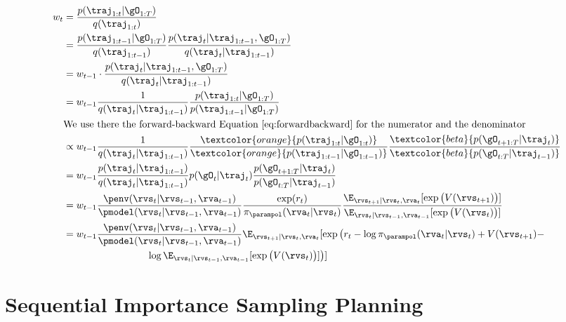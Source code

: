 \label{app:rec_weights}
\begin{align}
w_t &= \frac{p(\traj_{1:t} | \gO_{1:T})}{q(\traj_{1:t})} \nonumber\\
&= \frac{p(\traj_{1:t-1} | \gO_{1:T})}{q(\traj_{1:t-1})}\frac{p(\traj_t |\traj_{1:t-1}, \gO_{1:T})}{q(\traj_t | \traj_{1:t-1})} \nonumber\\
&= w_{t-1} \cdot \frac{p(\traj_t |\traj_{1:t-1}, \gO_{1:T})}{q(\traj_t | \traj_{1:t-1})} \nonumber\\
&= w_{t-1} \frac{1}{ q(\traj_t | \traj_{1:t-1})} \frac{p(\traj_{1:t} | \gO_{1:T})}{ p(\traj_{1:t-1} | \gO_{1:T})} \nonumber\\
&\text{We use there the forward-backward Equation~\ref{eq:forwardbackward} for the numerator and the denominator} \nonumber\\
 &\propto w_{t-1}   \frac{1}{ q(\traj_t | \traj_{1:t-1})} \frac{ \textcolor{orange}{p(\traj_{1:t} | \gO_{1:t})}}{ \textcolor{orange}{p(\traj_{1:t-1} | \gO_{1:t-1})}} \frac{ \textcolor{beta}{p(\gO_{t+1:T} | \traj_{t})}}{ \textcolor{beta}{p(\gO_{t:T} | \traj_{t-1})}}   \nonumber\\
&= w_{t-1}   \frac{ p(\traj_t | \traj_{1:t-1})}{ q(\traj_t | \traj_{1:t-1})}  p(\gO_t | \traj_t)   \frac{ p(\gO_{t+1:T} | \traj_{t})}{ p(\gO_{t:T} | \traj_{t-1})}  \nonumber\\
&= w_{t-1}    \frac{\penv(\rvs_{t} | \rvs_{t-1}, \rva_{t-1})}{ \pmodel(\rvs_{t} | \rvs_{t-1}, \rva_{t-1}) }   \frac{\exp (r_t)}{\pi_\parampol(\rva_t|\rvs_t)} \frac{\E_{\rvs_{t+1} | \rvs_t, \rva_t} [ \exp \big( V(\rvs_{t+1}) \big)] }{\E_{\rvs_{t} | \rvs_{t-1}, \rva_{t-1}} [ \exp \big( V(\rvs_{t}) \big)]}  \nonumber\\
&= w_{t-1} \frac{\penv(\rvs_{t} | \rvs_{t-1}, \rva_{t-1})}{ \pmodel(\rvs_{t} | \rvs_{t-1}, \rva_{t-1}) }  \E_{\rvs_{t+1} | \rvs_t, \rva_t} [ \exp \big( r_t  -  \log \pi_\parampol(\rva_t | \rvs_t) + V(\rvs_{t+1}) -\\
&\hspace{3cm}\log \E_{\rvs_{t} | \rvs_{t-1}, \rva_{t-1}} [ \exp \big( V(\rvs_{t}) \big)] \big)] \nonumber
\end{align}


\section{Sequential Importance Sampling Planning}
\label{app:sis_algo}



